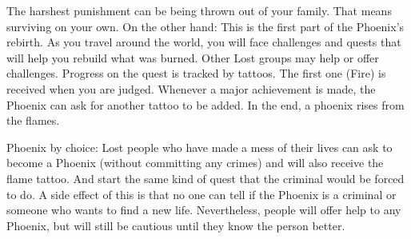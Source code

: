 The harshest punishment can be being thrown out of your family. That means surviving on your own. On the other hand: This is the first part of the Phoenix's rebirth. As you travel around the world, you will face challenges and quests that will help you rebuild what was burned. Other Lost groups may help or offer challenges.
Progress on the quest is tracked by tattoos. The first one (Fire) is received when you are judged. Whenever a major achievement is made, the Phoenix can ask for another tattoo to be added. In the end, a phoenix rises from the flames.

Phoenix by choice: Lost people who have made a mess of their lives can ask to become a Phoenix (without committing any crimes) and will also receive the flame tattoo. And start the same kind of quest that the criminal would be forced to do. A side effect of this is that no one can tell if the Phoenix is a criminal or someone who wants to find a new life. Nevertheless, people will offer help to any Phoenix, but will still be cautious until they know the person better.



